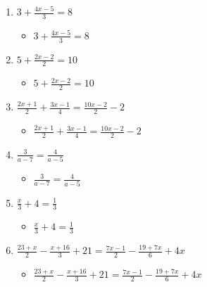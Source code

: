 \begin{enumerate}
\begin{itemize}
  \end{itemize}
\item {\Large $3+\frac{4x-5}{3}=8$}
  \begin{itemize}
  \item {\Large $3+\frac{4x-5}{3}=8$}
  \end{itemize}
\item {\Large $5+\frac{2x-2}{2}=10$}
  \begin{itemize}
  \item {\Large $5+\frac{2x-2}{2}=10$}
  \end{itemize}
\item {\Large $\frac{2x+1}{2}+\frac{3x-1}{4}=\frac{10x-2}{2}-2$}
  \begin{itemize}
  \item {\Large $\frac{2x+1}{2}+\frac{3x-1}{4}=\frac{10x-2}{2}-2$}
  \end{itemize}
\item {\Large $\frac{3}{a-7}=\frac{4}{a-5}$}
  \begin{itemize}
  \item {\Large $\frac{3}{a-7}=\frac{4}{a-5}$}
  \end{itemize}
\item {\Large $\frac{x}{3}+4=\frac{1}{3}$}
  \begin{itemize}
  \item {\Large $\frac{x}{3}+4=\frac{1}{3}$}
  \end{itemize}
\item {\Large $\frac{23+x}{2}-\frac{x+16}{3}+21=\frac{7x-1}{2}-\frac{19+7x}{6}+4x$}
  \begin{itemize}
  \item {\Large $\frac{23+x}{2}-\frac{x+16}{3}+21=\frac{7x-1}{2}-\frac{19+7x}{6}+4x$}
  \end{itemize}
\end{enumerate}
